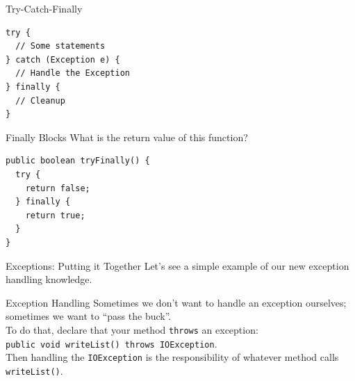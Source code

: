 \documentclass[aspectratio=169]{beamer}
\begin{document}
\begin{frame}[fragile]{Try-Catch-Finally}
\begin{Verbatim}
try {
  // Some statements   
} catch (Exception e) {
  // Handle the Exception
} finally {
  // Cleanup
}
\end{Verbatim}
\end{frame}



\begin{frame}[fragile]{Finally Blocks}
What is the return value of this function?

\begin{Verbatim}
public boolean tryFinally() {
  try {
    return false;
  } finally {
    return true;
  }
}
\end{Verbatim}
\end{frame}



\begin{frame}[fragile]{Exceptions: Putting it Together}
\Large
Let's see a simple example of our new exception handling knowledge.
\end{frame}




\begin{frame}{Exception Handling}
Sometimes we don't want to handle an exception ourselves; sometimes we want to ``pass the buck''.  \\
\vspace{1em}
To do that, declare that your method \texttt{throws} an exception: \\
\vspace{1em}
\texttt{public void writeList() throws IOException}. \\
\vspace{1em}
Then handling the \texttt{IOException} is the responsibility of whatever method calls \texttt{writeList()}. \\
\end{frame}
\end{document}
